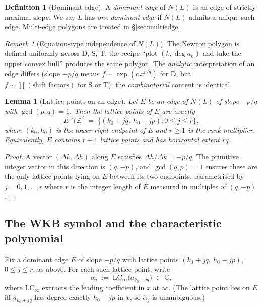 \documentclass[aip,jmp,preprint,amsmath,amssymb,nofootinbib,floatfix]{revtex4-2}
\theoremstyle{plain}
\newtheorem{lemma}[theorem]{Lemma}
\theoremstyle{definition}
\newtheorem{definition}[theorem]{Definition}
\theoremstyle{remark}
\newtheorem{remark}[theorem]{Remark}
\newcommand{\opD}{\mathrm{D}}                     %
\newcommand{\opS}{\mathrm{S}}                     %
\newcommand{\opT}{\mathrm{T}}                     %
\newcommand{\LCinf}{\mathrm{LC}_\infty}
\newcommand{\NL}{N(L)}
\begin{document}
\begin{definition}[Dominant edge]\label{def:dominant-edge}
A \emph{dominant edge} of $\NL$ is an edge of strictly maximal slope. We
say $L$ has \emph{one dominant edge} if $\NL$ admits a unique such edge.
Multi-edge polygons are treated in \S\ref{sec:multiedge}.
\end{definition}

\begin{remark}[Equation-type independence of $N(L)$]\label{rem:Newton-uniform}
The Newton polygon is defined uniformly across $\opD$, $\opS$, $\opT$:
the recipe ``plot $(k, \deg a_k)$ and take the upper convex hull'' produces
the same polygon. The \emph{analytic} interpretation of an edge differs
(slope $-p/q$ means $f \sim \exp(c\, x^{p/q})$ for $\opD$, but
$f \sim \prod (\text{shift factors})$ for $\opS$ or $\opT$); the
\emph{combinatorial} content is identical.
\end{remark}

\begin{lemma}[Lattice points on an edge]\label{lem:lattice-on-edge}
Let $E$ be an edge of $\NL$ of slope $-p/q$ with $\gcd(p, q) = 1$. Then
the lattice points of $E$ are exactly
\[
   E \cap \mathbb{Z}^2
   \;=\;
   \big\{(k_0 + jq,\ h_0 - jp) : 0 \le j \le r\big\},
\]
where $(k_0, h_0)$ is the lower-right endpoint of $E$ and $r \ge 1$ is the
\emph{rank multiplier}. Equivalently, $E$ contains $r + 1$ lattice points
and has horizontal extent $rq$.
\end{lemma}

\begin{proof}
A vector $(\Delta k, \Delta h)$ along $E$ satisfies
$\Delta h / \Delta k = -p/q$. The primitive integer vector in this
direction is $(q, -p)$, and $\gcd(q, p) = 1$ ensures these are the only
lattice points lying on $E$ between its two endpoints, parametrised by
$j = 0, 1, \dots, r$ where $r$ is the integer length of $E$ measured in
multiples of $(q, -p)$.
\end{proof}

\subsection{The WKB symbol and the characteristic polynomial}\label{ssec:prelim-WKB}

Fix a dominant edge $E$ of slope $-p/q$ with lattice points
$(k_0 + jq,\ h_0 - jp)$, $0 \le j \le r$, as above. For each such lattice
point, write
\[
   \alpha_j
   \;:=\;
   \LCinf\big(a_{k_0 + jq}\big)
   \;\in\; \mathbb{C},
\]
where $\LCinf$ extracts the leading coefficient in $x$ at $\infty$.
(The lattice point lies on $E$ iff $a_{k_0 + jq}$ has degree exactly
$h_0 - jp$ in $x$, so $\alpha_j$ is unambiguous.)
\end{document}
